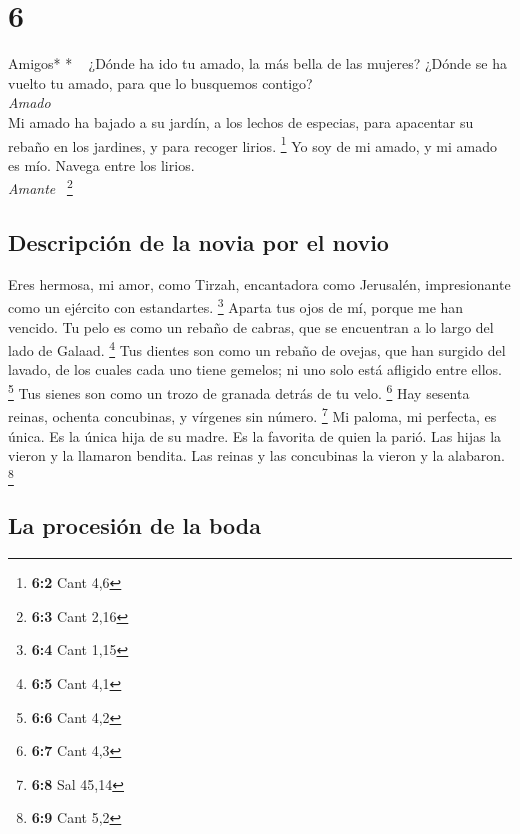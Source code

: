 \hypertarget{section-5}{%
\section{6}\label{section-5}}

\emph{\hfill\break
}Amigos* * ~ ¿Dónde ha ido tu amado, la más bella de las
mujeres? ¿Dónde se ha vuelto tu amado, para que lo busquemos contigo?\\
\emph{Amado}\\
 Mi amado ha bajado a su jardín, a los lechos de especias,
para apacentar su rebaño en los jardines, y para recoger lirios.
\footnote{\textbf{6:2} Cant 4,6}  Yo soy de mi amado, y mi
amado es mío. Navega entre los lirios.\\
\emph{Amante} ~\footnote{\textbf{6:3} Cant 2,16}

\hypertarget{descripciuxf3n-de-la-novia-por-el-novio-1}{%
\subsection{Descripción de la novia por el
novio}\label{descripciuxf3n-de-la-novia-por-el-novio-1}}

 Eres hermosa, mi amor, como Tirzah, encantadora como
Jerusalén, impresionante como un ejército con estandartes. \footnote{\textbf{6:4}
  Cant 1,15}  Aparta tus ojos de mí, porque me han
vencido. Tu pelo es como un rebaño de cabras, que se encuentran a lo
largo del lado de Galaad. \footnote{\textbf{6:5} Cant 4,1}
 Tus dientes son como un rebaño de ovejas, que han surgido
del lavado, de los cuales cada uno tiene gemelos; ni uno solo está
afligido entre ellos. \footnote{\textbf{6:6} Cant 4,2} 
Tus sienes son como un trozo de granada detrás de tu velo. \footnote{\textbf{6:7}
  Cant 4,3}  Hay sesenta reinas, ochenta concubinas, y
vírgenes sin número. \footnote{\textbf{6:8} Sal 45,14}  Mi
paloma, mi perfecta, es única. Es la única hija de su madre. Es la
favorita de quien la parió. Las hijas la vieron y la llamaron bendita.
Las reinas y las concubinas la vieron y la alabaron. \footnote{\textbf{6:9}
  Cant 5,2}

\hypertarget{la-procesiuxf3n-de-la-boda}{%
\subsection{La procesión de la boda}\label{la-procesiuxf3n-de-la-boda}}


